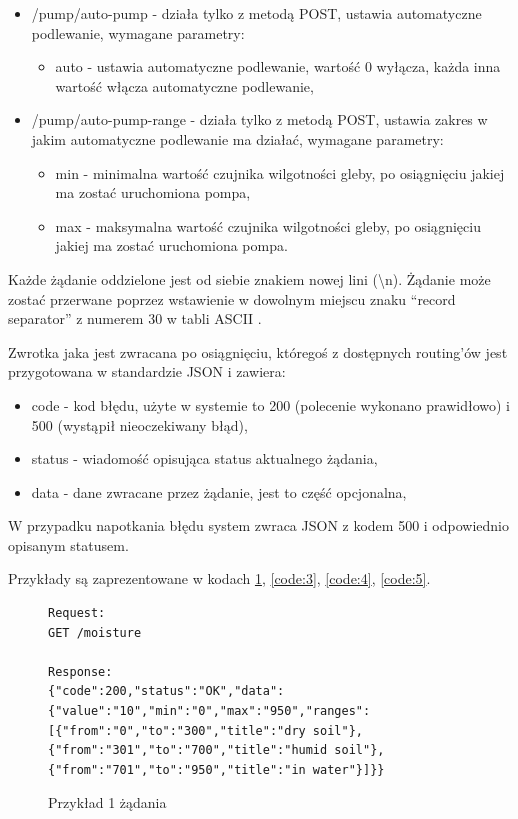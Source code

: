 \documentclass[a4paper,twoside,12pt]{book}
\begin{document}
\begin{itemize}
\begin{itemize}
            \item /pump/auto-pump - działa tylko z metodą POST, ustawia automatyczne podlewanie, wymagane parametry:
                  \begin{itemize}
                     \item auto - ustawia automatyczne podlewanie, wartość 0 wyłącza, każda inna wartość włącza automatyczne podlewanie,
                  \end{itemize}
            \item /pump/auto-pump-range - działa tylko z metodą POST, ustawia zakres w jakim automatyczne podlewanie ma działać, wymagane parametry:
                  \begin{itemize}
                     \item min - minimalna wartość czujnika wilgotności gleby, po osiągnięciu jakiej ma zostać uruchomiona pompa,
                     \item max - maksymalna wartość czujnika wilgotności gleby, po osiągnięciu jakiej ma zostać uruchomiona pompa.
                  \end{itemize}
         \end{itemize}
\end{itemize}

Każde żądanie oddzielone jest od siebie znakiem nowej lini (\textbackslash n). Żądanie może zostać przerwane poprzez wstawienie w dowolnym miejscu znaku ``record separator'' z numerem 30 w tabli ASCII \cite{bib:url007}.

Zwrotka jaka jest zwracana po osiągnięciu, któregoś z dostępnych routing'ów jest przygotowana w standardzie JSON i zawiera:

\begin{itemize}
   \item code - kod błędu, użyte w systemie to 200 (polecenie wykonano prawidłowo) i 500 (wystąpił nieoczekiwany błąd),
   \item status - wiadomość opisująca status aktualnego żądania,
   \item data - dane zwracane przez żądanie, jest to część opcjonalna,
\end{itemize}

W przypadku napotkania błędu system zwraca JSON z kodem 500 i odpowiednio opisanym statusem.

Przykłady są zaprezentowane w kodach \ref{code:2}, \ref{code:3}, \ref{code:4}, \ref{code:5}.

\begin{figure}[H]
   \centering
   \footnotesize
   \begin{lstlisting}
Request:
GET /moisture

Response:
{"code":200,"status":"OK","data":{"value":"10","min":"0","max":"950","ranges":[{"from":"0","to":"300","title":"dry soil"},{"from":"301","to":"700","title":"humid soil"},{"from":"701","to":"950","title":"in water"}]}}
   \end{lstlisting}
   \caption{Przykład 1 żądania}
   \label{code:2}
\end{figure}
\end{document}
